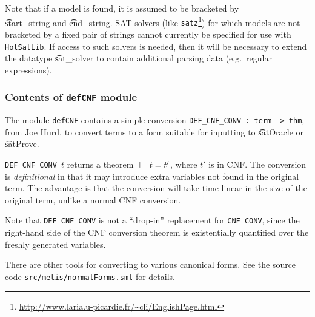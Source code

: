 \medskip

Note that if a model is found, it is assumed to be bracketed
by \\ \t{start\_string} and \t{end\_string}. SAT solvers 
(like {\tt satz}\footnote{\url{http://www.laria.u-picardie.fr/~cli/EnglishPage.html}})
for which models are not bracketed by a fixed pair of strings cannot currently
be specified for use with {\tt HolSatLib}. If access to such solvers is needed, then
it will be necessary to extend the datatype \t{sat\_solver} to contain
additional parsing data (e.g.~regular expressions).

\subsubsection{Contents of {\tt defCNF} module}

The module {\tt defCNF} contains a simple conversion  {\tt DEF\_CNF\_CONV : term -> thm}, 
from Joe Hurd, to convert \HOL{} terms to a form suitable for inputting to \t{satOracle} or \t{satProve}.

{\small\verb+DEF_CNF_CONV+}~$t$ returns a theorem $\ \vdash\  t = t'$,
where $t'$ is in CNF. The conversion is {\it definitional} in that it may introduce extra variables not found in the original term. The advantage is that the conversion will take time linear in the size of the original term, unlike a normal CNF conversion.

Note that {\tt DEF\_CNF\_CONV} is not a ``drop-in'' replacement for {\tt CNF\_CONV}, since the right-hand side of the CNF conversion theorem is existentially quantified over the freshly generated variables.

There are other tools for converting to various canonical forms. See the source code
{\small\verb+src/metis/normalForms.sml+} for details.


%

